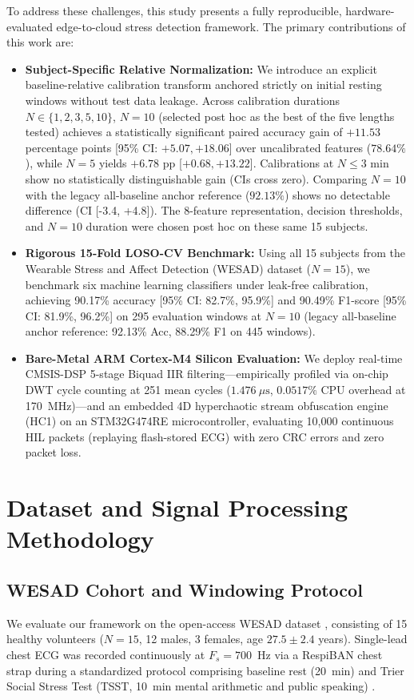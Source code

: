 \documentclass[preprint,12pt,3p]{elsarticle}
\begin{document}
To address these challenges, this study presents a fully reproducible, hardware-evaluated edge-to-cloud stress detection framework. The primary contributions of this work are:
\begin{itemize}
    \item \textbf{Subject-Specific Relative Normalization:} We introduce an explicit baseline-relative calibration transform anchored strictly on initial resting windows without test data leakage. Across calibration durations $N \in \{1, 2, 3, 5, 10\}$, $N=10$ (selected post hoc as the best of the five lengths tested) achieves a statistically significant paired accuracy gain of $+11.53$ percentage points [95\% CI: $+5.07, +18.06$] over uncalibrated features ($78.64\%$), while $N=5$ yields $+6.78$ pp [$+0.68, +13.22$]. Calibrations at $N \le 3$ min show no statistically distinguishable gain (CIs cross zero). Comparing $N=10$ with the legacy all-baseline anchor reference ($92.13\%$) shows no detectable difference (CI [-3.4, +4.8]). The 8-feature representation, decision thresholds, and $N=10$ duration were chosen post hoc on these same 15 subjects.
    \item \textbf{Rigorous 15-Fold LOSO-CV Benchmark:} Using all 15 subjects from the Wearable Stress and Affect Detection (WESAD) dataset ($N=15$), we benchmark six machine learning classifiers under leak-free calibration, achieving 90.17\% accuracy [95\% CI: 82.7\%, 95.9\%] and 90.49\% F1-score [95\% CI: 81.9\%, 96.2\%] on 295 evaluation windows at $N=10$ (legacy all-baseline anchor reference: 92.13\% Acc, 88.29\% F1 on 445 windows).
    \item \textbf{Bare-Metal ARM Cortex-M4 Silicon Evaluation:} We deploy real-time CMSIS-DSP 5-stage Biquad IIR filtering—empirically profiled via on-chip DWT cycle counting at 251 mean cycles ($1.476~\mu\text{s}$, $0.0517\%$ CPU overhead at 170~MHz)—and an embedded 4D hyperchaotic stream obfuscation engine (HC1) on an STM32G474RE microcontroller, evaluating 10,000 continuous HIL packets (replaying flash-stored ECG) with zero CRC errors and zero packet loss.
\end{itemize}

\section{Dataset and Signal Processing Methodology}

\subsection{WESAD Cohort and Windowing Protocol}
We evaluate our framework on the open-access WESAD dataset \cite{schmidt2018wesad}, consisting of 15 healthy volunteers ($N=15$, 12 males, 3 females, age $27.5 \pm 2.4$ years). Single-lead chest ECG was recorded continuously at $F_s = 700$~Hz via a RespiBAN chest strap during a standardized protocol comprising baseline rest (20~min) and Trier Social Stress Test (TSST, 10~min mental arithmetic and public speaking) \cite{kirschbaum1993trier}.
\end{document}
